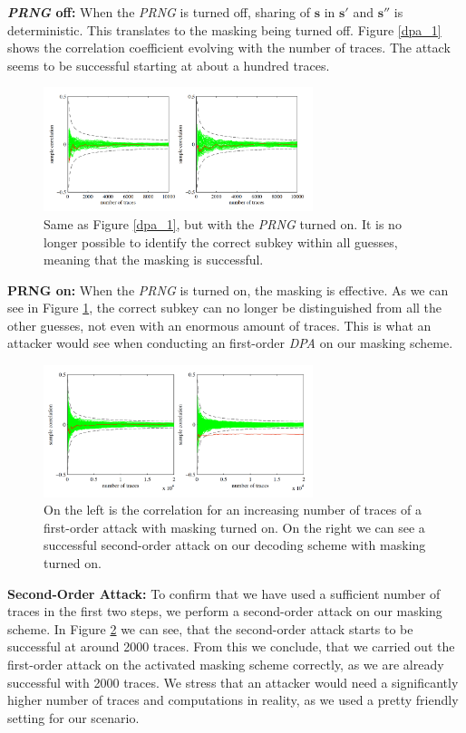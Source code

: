 \textbf{\textit{\acs{PRNG}} off:} When the \textit{\ac{PRNG}} is turned off, sharing of \(\textbf{s}\) in \(\textbf{s}'\) and \(\textbf{s}''\) is deterministic. This translates to the masking being turned off. Figure \ref{dpa_1} shows the correlation coefficient evolving with the number of traces. The attack seems to be successful starting at about a hundred traces.
\begin{figure}[H]
	\centering
	\includegraphics[width=0.7\textwidth]{dpa_2.png}
	\caption{Same as Figure \ref{dpa_1}, but with the \textit{\acs{PRNG}} turned on. It is no longer possible to identify the correct subkey within all guesses, meaning that the masking is successful. \cite{maskedRing}}
	\label{dpa_2}
\end{figure}

\textbf{\acs{PRNG} on:} When the \textit{\acs{PRNG}} is turned on, the masking is effective. As we can see in Figure \ref{dpa_2}, the correct subkey can no longer be distinguished from all the other guesses, not even with an enormous amount of traces. This is what an attacker would see when conducting an first-order \textit{\ac{DPA}} on our masking scheme.
\begin{figure}[H]
	\centering
	\includegraphics[width=0.7\textwidth]{dpa_3.png}
	\caption{On the left is the correlation for an increasing number of traces of a first-order attack with masking turned on. On the right we can see a successful second-order attack on our decoding scheme with masking turned on. \cite{maskedRing}}
	\label{dpa_3}
\end{figure}

\textbf{Second-Order Attack:} To confirm that we have used a sufficient number of traces in the first two steps, we perform a second-order attack on our masking scheme. In Figure \ref{dpa_3} we can see, that the second-order attack starts to be successful at around 2000 traces. From this we conclude, that we carried out the first-order attack on the activated masking scheme correctly, as we are already successful with 2000 traces. We stress that an attacker would need a significantly higher number of traces and computations in reality, as we used a pretty friendly setting for our scenario.